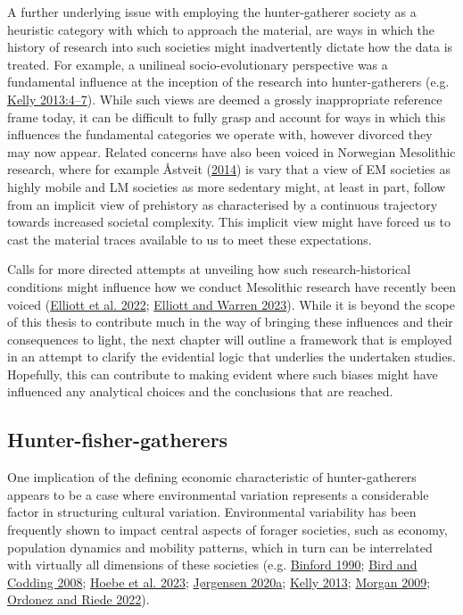 \documentclass[
  12pt,
  a4paper,
  oneside]{book}
\begin{document}
A further underlying issue with employing the hunter-gatherer society as a heuristic category with which to approach the material, are ways in which the history of research into such societies might inadvertently dictate how the data is treated. For example, a unilineal socio-evolutionary perspective was a fundamental influence at the inception of the research into hunter-gatherers (e.g. \protect\hyperlink{ref-kelly2013}{Kelly 2013:4--7}). While such views are deemed a grossly inappropriate reference frame today, it can be difficult to fully grasp and account for ways in which this influences the fundamental categories we operate with, however divorced they may now appear. Related concerns have also been voiced in Norwegian Mesolithic research, where for example Åstveit (\protect\hyperlink{ref-uxe5stveit2014}{2014}) is vary that a view of EM societies as highly mobile and LM societies as more sedentary might, at least in part, follow from an implicit view of prehistory as characterised by a continuous trajectory towards increased societal complexity. This implicit view might have forced us to cast the material traces available to us to meet these expectations.

Calls for more directed attempts at unveiling how such research-historical conditions might influence how we conduct Mesolithic research have recently been voiced (\protect\hyperlink{ref-elliott2022}{Elliott et al. 2022}; \protect\hyperlink{ref-elliott2023}{Elliott and Warren 2023}). While it is beyond the scope of this thesis to contribute much in the way of bringing these influences and their consequences to light, the next chapter will outline a framework that is employed in an attempt to clarify the evidential logic that underlies the undertaken studies. Hopefully, this can contribute to making evident where such biases might have influenced any analytical choices and the conclusions that are reached.

\hypertarget{hunter-fisher-gatherers}{%
\subsection{Hunter-fisher-gatherers}\label{hunter-fisher-gatherers}}

One implication of the defining economic characteristic of hunter-gatherers appears to be a case where environmental variation represents a considerable factor in structuring cultural variation. Environmental variability has been frequently shown to impact central aspects of forager societies, such as economy, population dynamics and mobility patterns, which in turn can be interrelated with virtually all dimensions of these societies (e.g. \protect\hyperlink{ref-binford1990}{Binford 1990}; \protect\hyperlink{ref-bird2008}{Bird and Codding 2008}; \protect\hyperlink{ref-hoebe2023}{Hoebe et al. 2023}; \protect\hyperlink{ref-jorgensen2020a}{Jørgensen 2020a}; \protect\hyperlink{ref-kelly2013}{Kelly 2013}; \protect\hyperlink{ref-morgan2009}{Morgan 2009}; \protect\hyperlink{ref-ordonez2022}{Ordonez and Riede 2022}).
\end{document}
